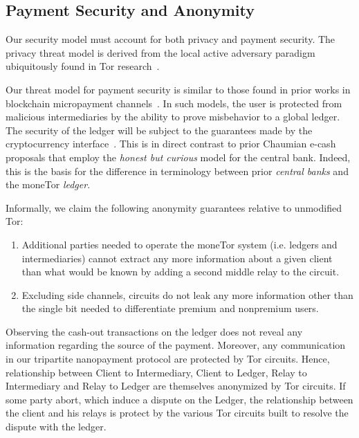 \subsection{Payment Security and Anonymity}
Our security model must account for both privacy and payment security. The
privacy threat model is derived from the local active adversary paradigm
ubiquitously found in Tor research~\cite{dingledine2004tor}.

Our threat model for payment security is similar to those found in prior works
in blockchain micropayment channels~\cite{poon2016bitcoin}. In such models, the
user is protected from malicious intermediaries by the ability to prove
misbehavior to a global ledger. The security of the ledger will be subject to
the guarantees made by the cryptocurrency interface~\cite{back2014enabling,
  poon2017plasma}. This is in direct contrast to prior Chaumian e-cash proposals
that employ the \emph{honest but curious} model for the central bank. Indeed,
this is the basis for the difference in terminology between prior \emph{central
  banks} and the moneTor \emph{ledger}.

Informally, we claim the following anonymity guarantees relative to unmodified Tor:

\begin{enumerate}
\item Additional parties needed to operate the moneTor system (i.e. ledgers and
  intermediaries) cannot extract any more information about a given client than
  what would be known by adding a second middle relay to the circuit.
\item Excluding side channels, circuits do not leak any more information other than the single bit needed to differentiate premium and nonpremium users.
\end{enumerate}

Observing the cash-out transactions on the ledger does not reveal any information regarding the source of the payment. Moreover, any communication in our tripartite nanopayment protocol are protected by Tor circuits. Hence, relationship between Client to Intermediary, Client to Ledger, Relay to Intermediary and Relay to Ledger are themselves anonymized by Tor circuits. If some party abort, which induce a dispute on the Ledger, the relationship between the client and his relays is protect by the various Tor circuits built to resolve the dispute with the ledger.

